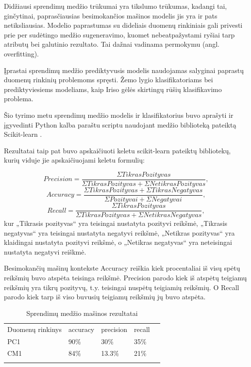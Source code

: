 \documentclass{VUMIFPSbakalaurinis}
\begin{document}
Didžiausi sprendimų medžio trūkumai yra tikslumo trūkumas, kadangi tai, ginčytinai, paprasčiausias besimokančios mašinos modelis jis yra ir pats netiksliausias. Modelio paprastumas su dideliais duomenų rinkiniais gali privesti prie per sudėtingo medžio sugeneravimo, kuomet nebeatpažystami ryšiai tarp atributų bei galutinio rezultato. Tai dažnai vadinama permokymu (angl. overfitting).

Įprastai sprendimų medžio prediktyvusis modelis naudojamas salyginai paprastų duomenų rinkinių problemoms spręsti. Žemo lygio klasifikatoriams bei prediktyviesiems modeliams, kaip Iriso gėlės skirtingų rūšių klasifikavimo problema.

Šio tyrimo metu sprendimų medžio modelis ir klasifikatorius buvo aprašyti ir įgyvedinti Python kalba paraštu scriptu naudojant medžio biblioteką pateiktą Scikit-learn \cite{scikit-learn}.

Rezultatai taip pat buvo apskaičiuoti keletu scikit-learn pateiktų bibliotekų, kurių viduje jie apskaičiuojami keletu formulių:

\[Precision = \frac{\Sigma Tikras Pozityvas}{\Sigma Tikras Pozityvas + \Sigma Netikras Pozityvas},\]
\[Accuracy = \frac{\Sigma Tikras Pozityvas + \Sigma Tikras Negatyvas}{\Sigma Pozityvai+ \Sigma Negatyvai},\]
\[Recall = \frac{\Sigma Tikras Pozityvas}{\Sigma Tikras Pozityvas + \Sigma Netikras Negatyvas},\]
kur „Tikrasis pozityvas“ yra teisingai nustatyta pozityvi reikšmė, „Tikrasis negatyvas“ yra teisingai nustatyta negatyvi reikšmė, „Netikras pozityvas“ yra klaidingai nustatyta pozityvi reikšmė, o „Netikras negatyvas“ yra neteisingai nustatyta negatyvi reiškmė.

Besimokančių mašinų kontekste Accuracy reiškia kiek procentaliai iš visų spėtų reikšmių buvo atspėta teisinga reikšmė. Precision parodo kiek iš atspėtų teigiamų reikšmių yra tikrų pozityvų, t.y. teisingai nuspėtų teigiamių reikšmių. O Recall parodo kiek tarp iš viso buvusių teigiamų reikšmių jų buvo atspėta.

\begin{table}[H]\footnotesize
\centering
\caption{Sprendimų medžio mašinos rezultatai}
\label{tab:Tree_result}
\begin{tabular}{lllll}
\cline{1-4}
\multicolumn{1}{|l}{Duomenų rinkinys} & accuracy & precision & \multicolumn{1}{l|}{recall} &  \\ \cline{1-4}
\multicolumn{1}{|l}{PC1}              & 90\%   & 30\%     & \multicolumn{1}{l|}{35\%} &  \\
\multicolumn{1}{|l}{CM1}              & 84\%    & 13.3\%     & \multicolumn{1}{l|}{21\%}  &  \\ \cline{1-4}
                                      &          &           &                             & 
\end{tabular}
\end{table}
\end{document}
